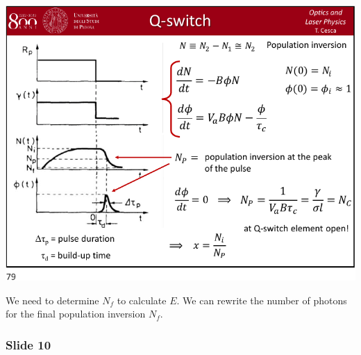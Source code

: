 \documentclass[../main/main.tex]{subfiles}
\begin{document}
\begin{minipage}[]{0.5\linewidth}
\centering
\includegraphics[page=9,width=1\textwidth]{../lessons/pdf_file/15_lecture.pdf}
\end{minipage}
\hspace{0.3cm}\vspace{0.3cm}
\begin{minipage}[c]{0.47\linewidth}

We need to determine \( N_f \) to calculate \( E \). We can rewrite the number of photons for the final population inversion \( N_f \).

\end{minipage}

\subsubsection*{Slide 10}
\end{document}
